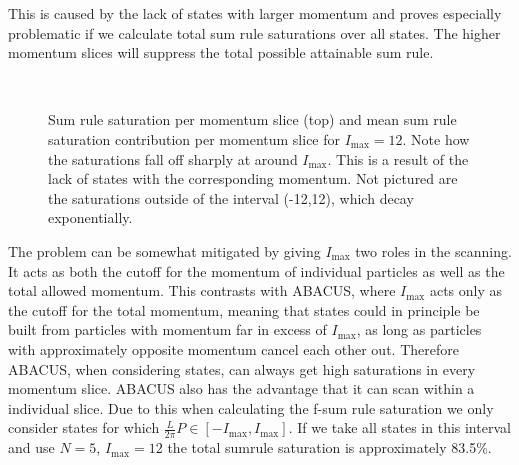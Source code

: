 \documentclass[11pt, a4paper]{report} %
\begin{document}
This is caused by the lack of states with larger momentum and proves especially problematic if we calculate total sum rule saturations over all states.
The higher momentum slices will suppress the total possible attainable sum rule.
\begin{figure}[tb!]
  \centering
   \\
   \caption{Sum rule saturation per momentum slice (top) and mean sum rule saturation contribution per momentum slice for \(I_{\max}=12\). Note how the saturations fall off sharply at around \(I_{\max}\). This is a result of the lack of states with the corresponding momentum. Not pictured are the saturations outside of the interval (-12,12), which decay exponentially.}
   \label{fig:saturationsperslice}
\end{figure}


The problem can be somewhat mitigated by giving \(I_{\max}\) two roles in the scanning.
It acts as both the cutoff for the momentum of individual particles as well as the total allowed momentum.
This contrasts with ABACUS, where \(I_{\max}\) acts only as the cutoff for the total momentum, meaning that states could in principle be built from particles with momentum far in excess of \(I_{\max}\), as long as particles with approximately opposite momentum cancel each other out.
Therefore ABACUS, when considering states, can always get high saturations in every momentum slice.
ABACUS also has the advantage that it can scan within a individual slice.
Due to this when calculating the f-sum rule saturation we only consider states for which \(\frac{L}{2\pi}P \in [-I_{\max},I_{\max}]\).
If we take all states in this interval and use \(N = 5\), \(I_{\max}=12\) the total sumrule saturation is approximately 83.5\%.
\end{document}
